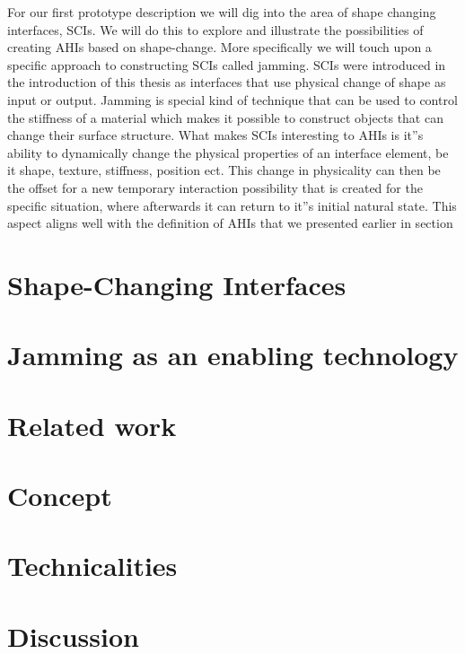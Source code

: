 For our first prototype description we will dig into the area of shape changing interfaces, SCIs.
We will do this to explore and illustrate the possibilities of creating AHIs based on shape-change.
More specifically we will touch upon a specific approach to constructing SCIs called jamming.
SCIs were introduced in the introduction of this thesis as interfaces that use physical change of shape as input or output.
Jamming is special kind of technique that can be used to control the stiffness of a material which makes it possible to construct objects that can change their surface structure.
What makes SCIs interesting to AHIs is it''s ability to dynamically change the physical properties of an interface element, be it shape, texture, stiffness, position ect.
This change in physicality can then be the offset for a new temporary interaction possibility that is created for the specific situation, where afterwards it can return to it''s initial natural state.
This aspect aligns well with the definition of AHIs that we presented earlier in section  

\section{Shape-Changing Interfaces}
\label{ch:jamming:shape-change} 


\section{Jamming as an enabling technology}
\label{ch:jamming:enabling-technology} 


\section{Related work}
\label{ch:jamming:related-work} 


\section{Concept}

\section{Technicalities}
\section{Discussion}
